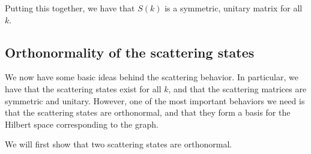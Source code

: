 \documentclass[../thesis-main/thesis-main]{subfiles}
\begin{document}
Putting this together, we have that $S(k)$ is a symmetric, unitary matrix for all $k$.

\subsection{Orthonormality of the scattering states}

We now have some basic ideas behind the scattering behavior.  In particular, we have that the scattering states exist for all $k$, and that the scattering matrices are symmetric and unitary.  However, one of the most important behaviors we need is that the scattering states are orthonormal, and that they form a basis for the Hilbert space corresponding to the graph. 

We will first show that two scattering states are orthonormal.
\end{document}

